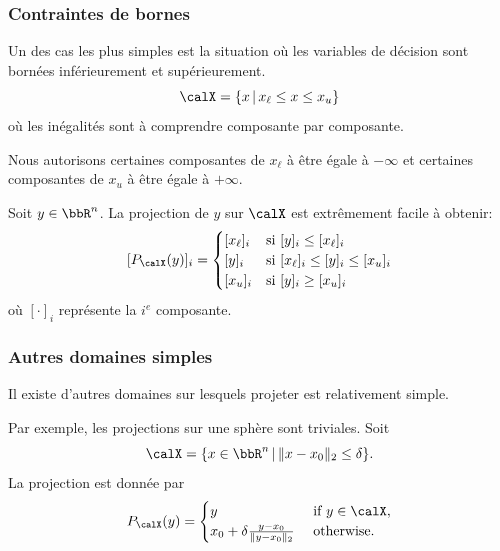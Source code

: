 \documentclass[t,aspectratio=169,usepdftitle=false]{beamer}
\def\cX{\calX}
\begin{document}
\begin{frame}
\frametitle{Contraintes de bornes}

Un des cas les plus simples est la situation où les variables de décision sont bornées inférieurement et supérieurement.
$$
\cX = \lbrace x \,|\, x_{\ell} \leq x \leq x_u \rbrace
$$
où les inégalités sont à comprendre composante par composante.

\mbox{}

Nous autorisons certaines composantes de $x_{\ell}$ à être égale à $-\infty$ et certaines composantes de $x_u$ à être égale à $+\infty$.

\mbox{}

Soit $y \in \bbR^n$. La projection de $y$ sur $\cX$ est extrêmement facile à obtenir:
$$
[P_{\cX}(y)]_i =
\begin{cases}
[x_{\ell}]_i & \mbox{si } [y]_i \leq [x_{\ell}]_i \\
[y]_i & \mbox{si } [x_{\ell}]_i \leq [y]_i \leq [x_u]_i \\
[x_u]_i & \mbox{si } [y]_i \geq [x_u]_i
\end{cases}
$$
où $[\cdot]_i$ représente la $i^e$ composante.

\end{frame}

\begin{frame}
\frametitle{Autres domaines simples}

Il existe d'autres domaines sur lesquels projeter est relativement simple.

\mbox{}

Par exemple, les projections sur une sphère sont triviales.
Soit
$$
\cX = \lbrace x \in \bbR^n \,|\, \| x - x_0 \|_2 \leq \delta \rbrace.
$$
La projection est donnée par
$$
P_{\cX}(y) =
\begin{cases}
y & \mbox{ if } y \in \cX, \\
x_0 + \delta \frac{y - x_0}{\| y - x_0 \|_2} & \mbox{ otherwise.}
\end{cases}
$$

\end{frame}
\end{document}
